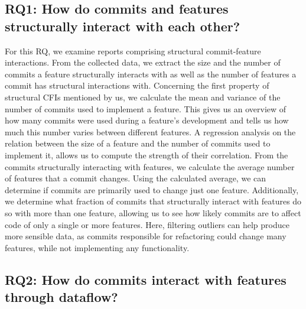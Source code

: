 \subsection*{\textbf{RQ1: How do commits and features structurally interact with each other?}}

For this RQ, we examine reports comprising structural commit-feature interactions.
From the collected data, we extract the size and the number of commits a feature structurally interacts with as well as the number of features a commit has structural interactions with.
Concerning the first property of structural CFIs mentioned by us, we calculate the mean and variance of the number of commits used to implement a feature.
This gives us an overview of how many commits were used during a feature's development and tells us how much this number varies between different features.
A regression analysis on the relation between the size of a feature and the number of commits used to implement it, allows us to compute the strength of their correlation. 
From the commits structurally interacting with features, we calculate the average number of features that a commit changes.
Using the calculated average, we can determine if commits are primarily used to change just one feature.
Additionally, we determine what fraction of commits that structurally interact with features do so with more than one feature, allowing us to see how likely commits are to affect code of only a single or more features.
Here, filtering outliers can help produce more sensible data, as commits responsible for refactoring could change many features, while not implementing any functionality. 

\subsection*{\textbf{RQ2: How do commits interact with features through dataflow?}}

